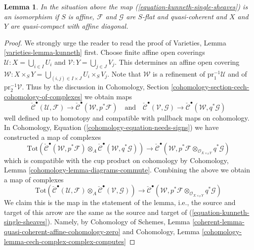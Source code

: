 \documentclass{stacks-project}
\theoremstyle{plain}
\newtheorem{lemma}[subsection]{Lemma}
\theoremstyle{definition}
\theoremstyle{remark}
\numberwithin{equation}{subsection}
\begin{document}
\begin{lemma}
\label{lemma-kunneth-single-sheaf}
In the situation above the map (\ref{equation-kunneth-single-sheaves}) is an
isomorphism if $S$ is affine, $\mathcal{F}$ and $\mathcal{G}$ are $S$-flat and
quasi-coherent and $X$ and $Y$ are quasi-compact with affine diagonal.
\end{lemma}

\begin{proof}
We strongly urge the reader to read the proof of
Varieties, Lemma \ref{varieties-lemma-kunneth} first.
Choose finite affine open coverings
$\mathcal{U} : X = \bigcup_{i \in I} U_i$ and
$\mathcal{V} : Y = \bigcup_{j \in J} V_j$.
This determines an affine open covering
$\mathcal{W} : X \times_S Y = \bigcup_{(i, j) \in I \times J} U_i \times_S V_j$.
Note that $\mathcal{W}$ is a refinement of
$\text{pr}_1^{-1}\mathcal{U}$ and of $\text{pr}_2^{-1}\mathcal{V}$.
Thus by the discussion in Cohomology, Section
\ref{cohomology-section-cech-cohomology-of-complexes}
we obtain maps
$$
\check{\mathcal{C}}^\bullet(\mathcal{U}, \mathcal{F})
\to
\check{\mathcal{C}}^\bullet(\mathcal{W}, p^*\mathcal{F})
\quad\text{and}\quad
\check{\mathcal{C}}^\bullet(\mathcal{V}, \mathcal{G})
\to
\check{\mathcal{C}}^\bullet(\mathcal{W}, q^*\mathcal{G})
$$
well defined up to homotopy and compatible with pullback maps on cohomology.
In Cohomology, Equation (\ref{cohomology-equation-needs-signs})
we have constructed a map of complexes
$$
\text{Tot}(
\check{\mathcal{C}}^\bullet(\mathcal{W}, p^*\mathcal{F})
\otimes_A
\check{\mathcal{C}}^\bullet(\mathcal{W}, q^*\mathcal{G}))
\longrightarrow
\check{\mathcal{C}}^\bullet(\mathcal{W},
p^*\mathcal{F} \otimes_{\mathcal{O}_{X \times_S Y}}
q^*\mathcal{G})
$$
which is compatible with the cup product on cohomology by
Cohomology, Lemma \ref{cohomology-lemma-diagrams-commute}.
Combining the above we obtain a map of complexes
\begin{equation}
\label{equation-kunneth-on-cech}
\text{Tot}(
\check{\mathcal{C}}^\bullet(\mathcal{U}, \mathcal{F})
\otimes_A
\check{\mathcal{C}}^\bullet(\mathcal{V}, \mathcal{G}))
\to
\check{\mathcal{C}}^\bullet(\mathcal{W},
p^*\mathcal{F}
\otimes_{\mathcal{O}_{X \times_S Y}}
q^*\mathcal{G})
\end{equation}
We claim this is the map in the statement of the lemma, i.e.,
the source and target of this arrow are the same as the source
and target of (\ref{equation-kunneth-single-sheaves}). Namely, by
Cohomology of Schemes, Lemma
\ref{coherent-lemma-quasi-coherent-affine-cohomology-zero}
and
Cohomology, Lemma \ref{cohomology-lemma-cech-complex-complex-computes}

\end{proof}
\end{document}
